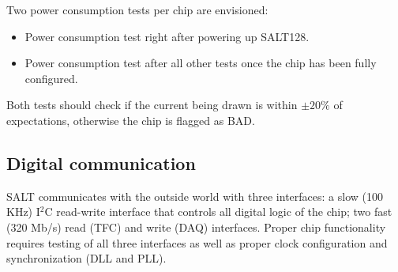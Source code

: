 \documentclass{lhcbnote}
\begin{document}
Two power consumption tests per chip are envisioned:

\begin{itemize}
\item Power consumption test right after powering up SALT128.
\item Power consumption test after all other tests once the chip has been fully configured.
\end{itemize}
Both tests should check if the current being drawn is within $\pm 20 \%$ of expectations, otherwise the chip is flagged as BAD.

\subsection{Digital communication}
SALT communicates with the outside world with three interfaces: a slow (100 KHz) I$^2$C read-write interface that controls all digital logic of the chip; two fast (320 Mb/s) read (TFC) and write (DAQ) interfaces. Proper chip functionality requires testing of all three interfaces as well as proper clock configuration and synchronization (DLL and PLL).
\end{document}
